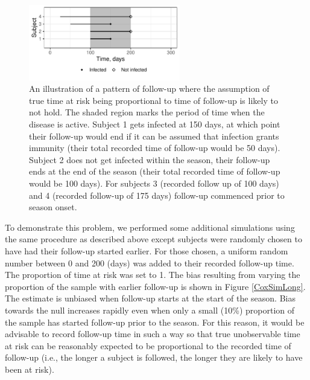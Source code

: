\begin{figure}[htp]
	\centering
	\includegraphics[width=0.59\textwidth]{../curve-cox/timeplot_4_light.pdf}
	\caption{
	An illustration of a pattern of follow-up where the assumption of true time at risk being proportional to time of follow-up is likely to not hold. The shaded region marks the period of time when the disease is active. Subject 1 gets infected at 150 days, at which point their follow-up would end if it can be assumed that infection grants immunity (their total recorded time of follow-up would be 50 days). Subject 2 does not get infected within the season, their follow-up ends at the end of the season (their total recorded time of follow-up would be 100 days). For subjects 3 (recorded follow up of 100 days) and 4 (recorded follow-up of 175 days) follow-up commenced prior to season onset.
	}
	\label{CoxNotIdeal}
\end{figure}


To demonstrate this problem, we performed some additional simulations using the same procedure as described above except subjects were randomly chosen to have had their follow-up started earlier. For those chosen, a uniform random number between 0 and 200 (days) was added to their recorded follow-up time. The proportion of time at risk was set to 1. The bias resulting from varying the proportion of the sample with earlier follow-up is shown in Figure \ref{CoxSimLong}. The estimate is unbiased when follow-up starts at the start of the season. Bias towards the null increases rapidly even when only a small (10\%) proportion of the sample has started follow-up prior to the season. For this reason, it would be advisable to record follow-up time in such a way so that true unobservable time at risk can be reasonably expected to be proportional to the recorded time of follow-up (i.e., the longer a subject is followed, the longer they are likely to have been at risk).

